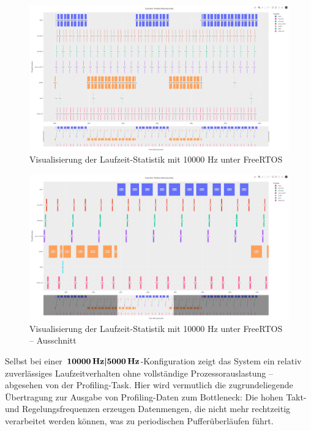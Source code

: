 \begin{figure}[H]
    \centering
    \includegraphics[width=1\textwidth]{assets/freertos_profiling_10000hz}
    \caption{Visualisierung der Laufzeit-Statistik mit 10000 Hz unter FreeRTOS}
\end{figure}
\begin{figure}[H]
    \centering
    \includegraphics[width=1\textwidth]{assets/freertos_profiling_10000hz_ausschnitt}
    \caption{Visualisierung der Laufzeit-Statistik mit 10000 Hz unter FreeRTOS --
    Ausschnitt}
\end{figure}

Selbst bei einer $\textbf{10000\,\text{Hz}|5000\,\text{Hz}}$-Konfiguration zeigt
das System ein relativ zuverlässiges Laufzeitverhalten ohne vollständige
Prozessorauslastung -- abgesehen von der Profiling-Task. Hier wird vermutlich
die zugrundeliegende Übertragung zur Ausgabe von Profiling-Daten zum Bottleneck:
Die hohen Takt- und Regelungsfrequenzen erzeugen Datenmengen, die nicht mehr
rechtzeitig verarbeitet werden können, was zu periodischen Pufferüberläufen
führt.

